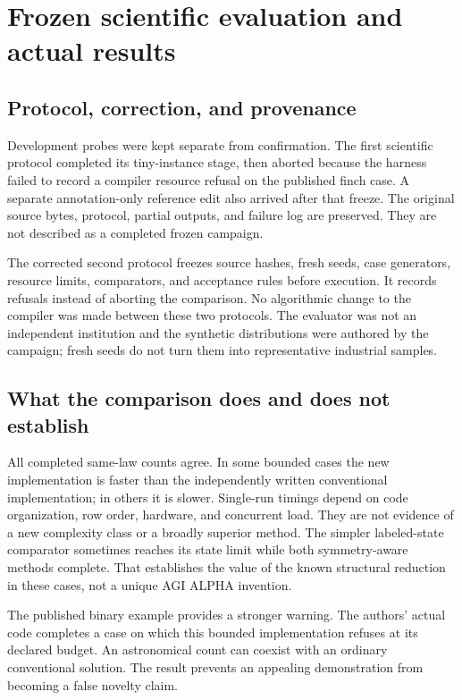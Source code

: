 \documentclass[11pt,letterpaper]{article}
\begin{document}
\section{Frozen scientific evaluation and actual results}

\subsection{Protocol, correction, and provenance}

Development probes were kept separate from confirmation. The first scientific protocol
completed its tiny-instance stage, then aborted because the harness failed to record
a compiler resource refusal on the published finch case. A separate annotation-only
reference edit also arrived after that freeze. The original source bytes, protocol,
partial outputs, and failure log are preserved. They are not described as a completed
frozen campaign.

The corrected second protocol freezes source hashes, fresh seeds, case generators,
resource limits, comparators, and acceptance rules before execution. It records refusals
instead of aborting the comparison. No algorithmic change to the compiler was made
between these two protocols. The evaluator was not an independent institution and
the synthetic distributions were authored by the campaign; fresh seeds do not turn
them into representative industrial samples.



\subsection{What the comparison does and does not establish}

All completed same-law counts agree. In some bounded cases the new implementation is
faster than the independently written conventional implementation; in others it is
slower. Single-run timings depend on code organization, row order, hardware, and concurrent
load. They are not evidence of a new complexity class or a broadly superior method.
The simpler labeled-state comparator sometimes reaches its state limit while both
symmetry-aware methods complete. That establishes the value of the known structural
reduction in these cases, not a unique AGI ALPHA invention.

The published binary example provides a stronger warning. The authors' actual code
completes a case on which this bounded implementation refuses at its declared budget.
An astronomical count can coexist with an ordinary conventional solution. The result
prevents an appealing demonstration from becoming a false novelty claim.
\end{document}
